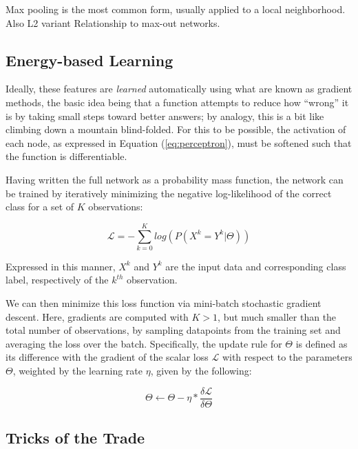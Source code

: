 Max pooling is the most common form, usually applied to a local neighborhood.
Also L2 variant
Relationship to max-out networks.


\subsection{Energy-based Learning}

Ideally, these features are \emph{learned} automatically using what are known as gradient methods, the basic idea being that a function attempts to reduce how ``wrong'' it is by taking small steps toward better answers; by analogy, this is a bit like climbing down a mountain blind-folded.
For this to be possible, the activation of each node, as expressed in Equation (\ref{eq:perceptron}), must be softened such that the function is differentiable.


Having written the full network as a probability mass function, the network can be trained by iteratively minimizing the negative log-likelihood of the correct class for a set of $K$ observations:

\begin{equation}
\label{eq:nll}
\mathcal{L}=-\sum_{k=0}^K log(P(X^k = Y^k \vert \Theta))
\end{equation}

\noindent Expressed in this manner, $X^k$ and $Y^k$ are the input data and corresponding class label, respectively of the $k^{th}$ observation.

We can then minimize this loss function via mini-batch stochastic gradient descent.
Here, gradients are computed with $K>1$, but much smaller than the total number of observations, by sampling datapoints from the training set and averaging the loss over the batch.
Specifically, the update rule for $\Theta$ is defined as its difference with the gradient of the scalar loss $\mathcal{L}$ with respect to the parameters $\Theta$, weighted by the learning rate $\eta$, given by the following:

\begin{equation}
\label{eq:updaterule}
\Theta \leftarrow \Theta - \eta * \frac{ \delta \mathcal{L}}{\delta \Theta}
\end{equation}


\subsection{Tricks of the Trade}
\label{subsec:tricks}

